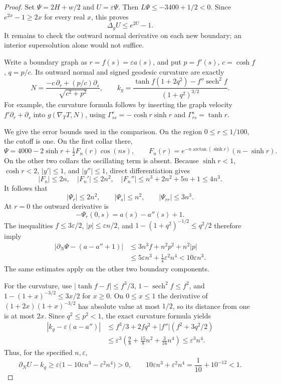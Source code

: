 \begin{proof}
Set $\Psi=2H+w/2$ and $U=\varepsilon\Psi$. Then $L\Psi\le-3400+1/2<0$. Since $e^{2x}-1\ge2x$ for every real $x$, this proves
\[
 \Delta_g U\le e^{2U}-1.
\]
It remains to check the outward normal derivative on each new boundary; an interior supersolution alone would not suffice.

Write a boundary graph as $r=f(s)=\varepsilon a(s)$, and put $p=f'(s)$, $c=\cosh f$, $q=p/c$. Its outward normal and signed geodesic curvature are exactly
\[
 N=\frac{-c\,\partial_r+(p/c)\partial_s}{\sqrt{c^2+p^2}},\qquad
 k_g=\frac{\tanh f(1+2q^2)-f''\operatorname{sech}^2f}
                {(1+q^2)^{3/2}}.
\]
For example, the curvature formula follows by inserting the graph velocity $f'\partial_r+\partial_s$ into $g(\nabla_TT,N)$, using $\Gamma^r_{ss}=-\cosh r\sinh r$ and $\Gamma^s_{rs}=\tanh r$.

We give the error bounds used in the comparison. On the region $0\le r\le1/100$, the cutoff is one. On the first collar there,
\[
 \Psi=4000-2\sinh r+\tfrac12F_n(r)\cos(ns),\qquad
 F_n(r)=e^{-n\arctan(\sinh r)}(n-\sinh r).
\]
On the other two collars the oscillating term is absent. Because $\sinh r<1$, $\cosh r<2$, $|y'|\le1$, and $|y''|\le1$, direct differentiation gives
\[
 |F_n|\le2n,\quad |F_n'|\le2n^2,\quad
 |F_n''|\le n^3+2n^2+5n+1\le4n^3.
\]
It follows that
\[
 |\Psi_r|\le2n^2,\qquad |\Psi_s|\le n^2,
 \qquad |\Psi_{rr}|\le3n^3.
\]
At $r=0$ the outward derivative is
\[
 -\Psi_r(0,s)=a(s)-a''(s)+1.
\]
The inequalities $f\le3\varepsilon/2$, $|p|\le\varepsilon n/2$, and
$1-(1+q^2)^{-1/2}\le q^2/2$ therefore imply
\begin{align*}
 |\partial_N\Psi-(a-a''+1)|
 &\le 3n^3f+n^2p^2+n^2|p|\\
 &\le5\varepsilon n^3+\tfrac14\varepsilon^2n^4
 <10\varepsilon n^3.
\end{align*}
The same estimates apply on the other two boundary components.

For the curvature, use $|\tanh f-f|\le f^3/3$,
$1-\operatorname{sech}^2f\le f^2$, and
$1-(1+x)^{-3/2}\le3x/2$ for $x\ge0$. On $0\le x\le1$ the derivative of $(1+2x)(1+x)^{-3/2}$ has absolute value at most $1/2$, so its distance from one is at most $2x$. Since $q^2\le p^2<1$, the exact curvature formula yields
\begin{align*}
 |k_g-\varepsilon(a-a'')|
 &\le f^3/3+2fq^2+|f''|(f^2+3q^2/2)\\
 &\le\varepsilon^3\left(\tfrac98+\tfrac{15}8n^2+\tfrac3{16}n^4\right)
 \le\varepsilon^3n^4.
\end{align*}
Thus, for the specified $n,\varepsilon$,
\[
 \partial_NU-k_g
 \ge\varepsilon\bigl(1-10\varepsilon n^3-\varepsilon^2n^4\bigr)>0,
 \qquad 10\varepsilon n^3+\varepsilon^2n^4=\frac1{10}+10^{-12}<1.
\]


\end{proof}
